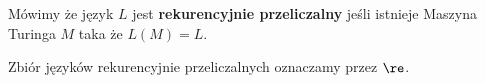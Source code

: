 
\begin{definition}
	Mówimy że język \( L \) jest \textbf{rekurencyjnie przeliczalny} jeśli istnieje Maszyna Turinga \( M \) taka że \( L(M) = L \).

	Zbiór języków rekurencyjnie przeliczalnych oznaczamy przez \( \re \).
\end{definition}
